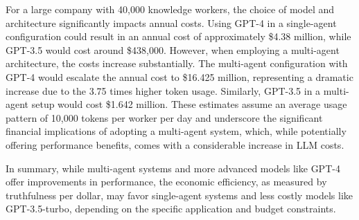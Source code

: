             For a large company with 40,000 knowledge workers, the choice of model and architecture significantly impacts annual costs. 
            Using GPT-4 in a single-agent configuration could result in an annual cost of approximately \$4.38 million, while GPT-3.5 would cost around \$438,000. However, when employing a multi-agent architecture, the costs increase substantially. 
            The multi-agent configuration with GPT-4 would escalate the annual cost to \$16.425 million, representing a dramatic increase due to the 3.75 times higher token usage. 
            Similarly, GPT-3.5 in a multi-agent setup would cost \$1.642 million. 
            These estimates assume an average usage pattern of 10,000 tokens per worker per day and underscore the significant financial implications of adopting a multi-agent system, which, while potentially offering performance benefits, comes with a considerable increase in LLM costs.

            In summary, while multi-agent systems and more advanced models like GPT-4 offer improvements in performance, the economic efficiency, as measured by truthfulness per dollar, may favor single-agent systems and less costly models like GPT-3.5-turbo, depending on the specific application and budget constraints.
            
        
